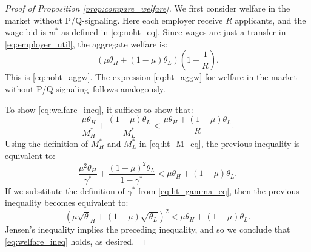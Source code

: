 \documentclass[11pt]{article}
\newcommand{\hottowel}{P/Q-signaling}
\begin{document}
\begin{proof}[Proof of Proposition \ref{prop:compare_welfare}]
We first consider welfare in the market without \hottowel.
Here each employer receive $R$ applicants, and the wage bid is $w^*$ as defined in \eqref{eq:noht_eq}.
Since wages are just a transfer in \eqref{eq:employer_util}, the aggregate welfare is:
\[ (\mu \theta_H + (1-\mu)\theta_L)\left( 1 - \frac{1}{R}\right). \]
This is \eqref{eq:noht_aggw}.
The expression \eqref{eq:ht_aggw} for welfare in the market without \hottowel~follows analogously.  

To show \eqref{eq:welfare_ineq}, it suffices to show that:
\[ \frac{\mu\theta_H}{M_H^*} + \frac{(1-\mu)\theta_L}{M_L^*} < \frac{\mu \theta_H + (1-\mu)\theta_L}{R}. \]
Using the definition of $M_H^*$ and $M_L^*$ in \eqref{eq:ht_M_eq}, the previous inequality is equivalent to:
\[ \frac{\mu^2 \theta_H}{\gamma^*} + \frac{(1-\mu)^2 \theta_L}{1 - \gamma^*} < \mu \theta_H + (1-\mu)\theta_L. \]
If we substitute the definition of $\gamma^*$ from \eqref{eq:ht_gamma_eq}, then the previous inequality becomes equivalent to:
\[ ( \mu \sqrt{\theta}_H + (1-\mu) \sqrt{\theta_L})^2 < \mu \theta_H + (1- \mu)\theta_L. \]
Jensen's inequality implies the preceding inequality, and so we conclude that \eqref{eq:welfare_ineq} holds, as desired.
\end{proof}
\end{document}
